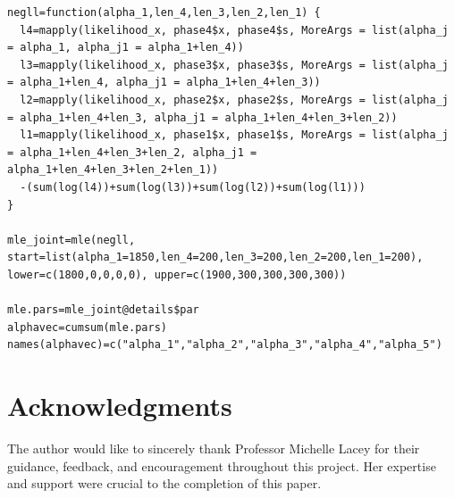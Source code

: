 \documentclass{article}
\begin{document}
\begin{lstlisting}
negll=function(alpha_1,len_4,len_3,len_2,len_1) {
  l4=mapply(likelihood_x, phase4$x, phase4$s, MoreArgs = list(alpha_j = alpha_1, alpha_j1 = alpha_1+len_4))
  l3=mapply(likelihood_x, phase3$x, phase3$s, MoreArgs = list(alpha_j = alpha_1+len_4, alpha_j1 = alpha_1+len_4+len_3))
  l2=mapply(likelihood_x, phase2$x, phase2$s, MoreArgs = list(alpha_j = alpha_1+len_4+len_3, alpha_j1 = alpha_1+len_4+len_3+len_2))
  l1=mapply(likelihood_x, phase1$x, phase1$s, MoreArgs = list(alpha_j = alpha_1+len_4+len_3+len_2, alpha_j1 = alpha_1+len_4+len_3+len_2+len_1))
  -(sum(log(l4))+sum(log(l3))+sum(log(l2))+sum(log(l1)))
}

mle_joint=mle(negll, start=list(alpha_1=1850,len_4=200,len_3=200,len_2=200,len_1=200), lower=c(1800,0,0,0,0), upper=c(1900,300,300,300,300))

mle.pars=mle_joint@details$par
alphavec=cumsum(mle.pars)
names(alphavec)=c("alpha_1","alpha_2","alpha_3","alpha_4","alpha_5")
\end{lstlisting}

\section*{Acknowledgments}
The author would like to sincerely thank Professor Michelle Lacey for their guidance, feedback, and encouragement throughout this project. Her expertise and support were crucial to the completion of this paper.










\end{document}
